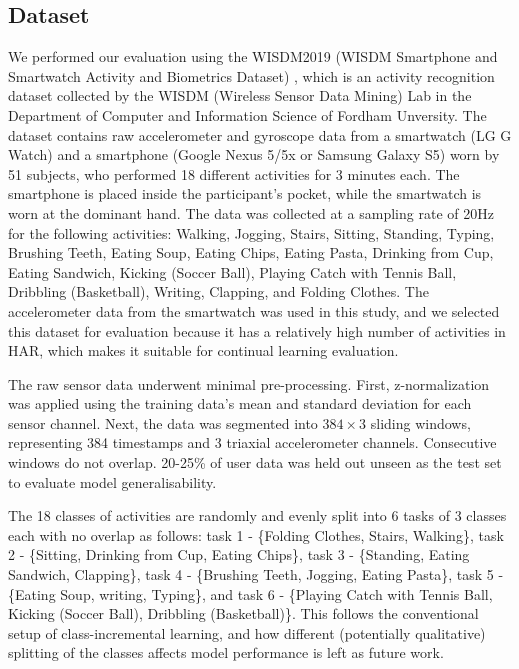 \begin{appendix}
{\subsection{Dataset}
We performed our evaluation using the WISDM2019 (WISDM Smartphone and Smartwatch Activity and Biometrics Dataset) \cite{weiss2019wisdm}, which is an activity recognition dataset collected by the WISDM (Wireless Sensor Data Mining) Lab in the Department of Computer and Information Science of Fordham Unversity. The dataset contains raw accelerometer and gyroscope data from a smartwatch (LG G Watch) and a smartphone (Google Nexus 5/5x or Samsung Galaxy S5) worn by 51 subjects, who performed 18 different activities for 3 minutes each. The smartphone is placed inside the participant's pocket, while the smartwatch is worn at the dominant hand. The data was collected at a sampling rate of 20Hz for the following activities: Walking, Jogging, Stairs, Sitting, Standing, Typing, Brushing Teeth, Eating Soup, Eating Chips, Eating Pasta, Drinking from Cup, Eating Sandwich, Kicking (Soccer Ball), Playing Catch with Tennis Ball, Dribbling (Basketball), Writing, Clapping, and Folding Clothes. The accelerometer data from the smartwatch was used in this study, and we selected this dataset for evaluation because it has a relatively high number of activities in HAR, which makes it suitable for continual learning evaluation.

The raw sensor data underwent minimal pre-processing. First, z-normalization was applied using the training data's mean and standard deviation for each sensor channel. Next, the data was segmented into \(384 \times 3\) sliding windows, representing 384 timestamps and 3 triaxial accelerometer channels. Consecutive windows do not overlap. 20-25\% of user data was held out unseen as the test set to evaluate model generalisability. 

The 18 classes of activities are randomly and evenly split into 6 tasks of 3 classes each with no overlap as follows: task 1 - \{Folding Clothes, Stairs, Walking\}, 
task 2 - \{Sitting, Drinking from Cup, Eating Chips\}, 
task 3 - \{Standing, Eating Sandwich, Clapping\}, 
task 4 - \{Brushing Teeth, Jogging, Eating Pasta\},
task 5 - \{Eating Soup, writing, Typing\}, and
task 6 - \{Playing Catch with Tennis Ball, Kicking (Soccer Ball), Dribbling (Basketball)\}. This follows the conventional setup of class-incremental learning, and how different (potentially qualitative) splitting of the classes affects model performance is left as future work.

}
\end{appendix}
